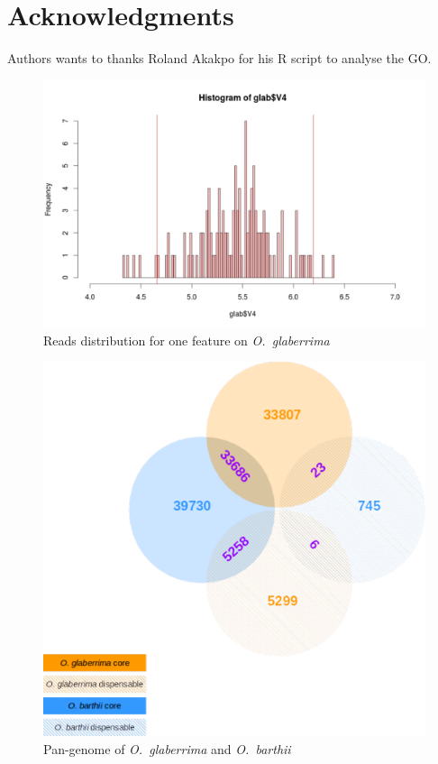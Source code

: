 \documentclass[10pt,letterpaper]{article}
\begin{document}
\section*{Acknowledgments}
Authors wants to thanks Roland Akakpo for his R script to analyse the GO.

\nolinenumbers

\begin{figure}
\centering
 \includegraphics[scale=0.7]{readsDistri.pdf}
 \caption{Reads distribution for one feature on \emph{O.~glaberrima}}
 \label{distri}
\end{figure}

\begin{figure}
\centering
\includegraphics[scale=0.7]{panGenomeBothSpecies.pdf}
\caption{Pan-genome of \emph{O.~glaberrima} and \emph{O.~barthii}}
\label{panGSize}
\end{figure}
\end{document}
